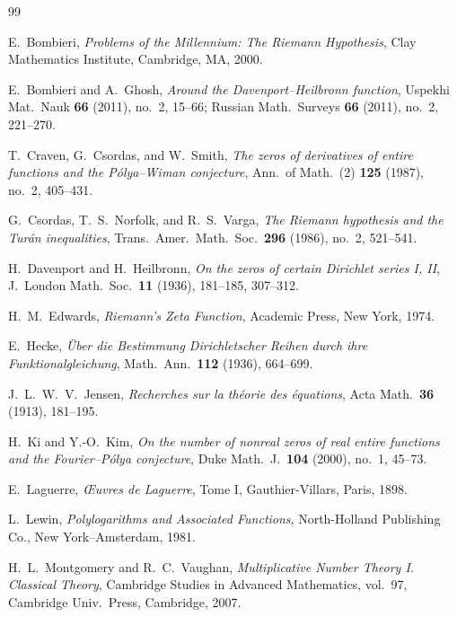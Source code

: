 \documentclass[11pt,reqno]{amsart}
\theoremstyle{definition}
\theoremstyle{remark}
\numberwithin{equation}{section}
\begin{document}
\begin{thebibliography}{99}

E.~Bombieri, \emph{Problems of the Millennium: The Riemann Hypothesis}, Clay Mathematics Institute, Cambridge, MA, 2000.

E.~Bombieri and A.~Ghosh, \emph{Around the Davenport--Heilbronn function}, Uspekhi Mat.\ Nauk \textbf{66} (2011), no.~2, 15--66; Russian Math.\ Surveys \textbf{66} (2011), no.~2, 221--270.

T.~Craven, G.~Csordas, and W.~Smith, \emph{The zeros of derivatives of entire functions and the P\'{o}lya--Wiman conjecture}, Ann.\ of Math.\ (2) \textbf{125} (1987), no.~2, 405--431.

G.~Csordas, T.~S.~Norfolk, and R.~S.~Varga, \emph{The Riemann hypothesis and the Tur\'{a}n inequalities}, Trans.\ Amer.\ Math.\ Soc.\ \textbf{296} (1986), no.~2, 521--541.

H.~Davenport and H.~Heilbronn, \emph{On the zeros of certain Dirichlet series I, II}, J.\ London Math.\ Soc.\ \textbf{11} (1936), 181--185, 307--312.

H.~M.~Edwards, \emph{Riemann's Zeta Function}, Academic Press, New York, 1974.

E.~Hecke, \emph{\"{U}ber die Bestimmung Dirichletscher Reihen durch ihre Funktionalgleichung}, Math.\ Ann.\ \textbf{112} (1936), 664--699.

J.~L.~W.~V.~Jensen, \emph{Recherches sur la th\'{e}orie des \'{e}quations}, Acta Math.\ \textbf{36} (1913), 181--195.

H.~Ki and Y.-O.~Kim, \emph{On the number of nonreal zeros of real entire functions and the Fourier--P\'{o}lya conjecture}, Duke Math.\ J.\ \textbf{104} (2000), no.~1, 45--73.

E.~Laguerre, \emph{\OE uvres de Laguerre}, Tome I, Gauthier-Villars, Paris, 1898.

L.~Lewin, \emph{Polylogarithms and Associated Functions}, North-Holland Publishing Co., New York--Amsterdam, 1981.

H.~L.~Montgomery and R.~C.~Vaughan, \emph{Multiplicative Number Theory I. Classical Theory}, Cambridge Studies in Advanced Mathematics, vol.~97, Cambridge Univ.\ Press, Cambridge, 2007.


\end{thebibliography}
\end{document}
